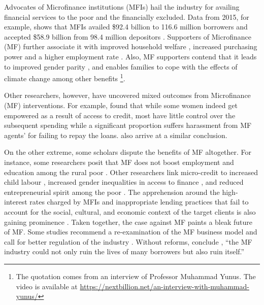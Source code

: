 \documentclass[a4paper,nobind]{templates/ociamthesis}
\begin{document}
\noindent Advocates of Microfinance institutions (MFIs) hail the industry for availing financial services to the poor and the financially excluded. Data from 2015, for example, shows that MFIs availed \$92.4 billion to 116.6 million borrowers and accepted \$58.9 billion from 98.4 million depositors \autocite{market2014global}. Supporters of Microfinance (MF) further associate it with improved household welfare \autocite{meador2017food,you2013role}, increased purchasing power and a higher employment rate \autocite{raihan2017macro,lopatta2016microfinance}. Also, MF supporters contend that it leads to improved gender parity \autocite{mafukata2017reciprocal,zhang2017microfinance}, and enables families to cope with the effects of climate change \autocite{fenton2017role} among other benefits \footnote{The quotation comes from an interview of Professor Muhammad Yunus. The video is available at \url{https://nextbillion.net/an-interview-with-muhammad-yunus/}}.

Other researchers, however, have uncovered mixed outcomes from Microfinance (MF) interventions. For example, \textcite{ganle2015microcredit} found that while some women indeed get empowered as a result of access to credit, most have little control over the subsequent spending while a significant proportion suffers harassment from MF agents' for failing to repay the loans. \textcite{van2012impact} also arrive at a similar conclusion.

On the other extreme, some scholars dispute the benefits of MF altogether. For instance, some researchers posit that MF does not boost employment and education among the rural poor \autocite{bauchet2013micro}. Other researchers link micro-credit to increased child labour \autocite{hazarika2008household}, increased gender inequalities in access to finance \autocite{zulfiqar2017does}, and reduced entrepreneurial spirit among the poor \autocite{field2013does}. The apprehension around the high-interest rates charged by MFIs and inappropriate lending practices that fail to account for the social, cultural, and economic context of the target clients is also gaining prominence \autocite{chester2016one}. Taken together, the case against MF paints a bleak future of MF. Some studies recommend a re-examination of the MF business model and call for better regulation of the industry \autocite{johnson2013microfinance,ghosh2013microfinance}. Without reforms, conclude \textcite{chester2016one}, ``the MF industry could not only ruin the lives of many borrowers but also ruin itself.''
\end{document}
